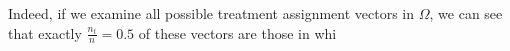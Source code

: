 \documentclass[11pt]{article}\usepackage[]{graphicx}\usepackage[]{color}
\theoremstyle{newstyle}
\begin{document}
Indeed, if we examine all possible treatment assignment vectors in $\Omega$, we can see that exactly $\frac{n_t}{n} = 0.5$ of these vectors are those in whi
\end{document}

